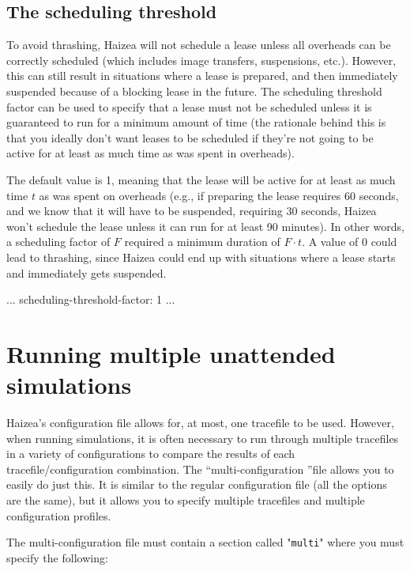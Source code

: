 \subsection{The scheduling threshold}

To avoid thrashing, Haizea will not schedule a lease unless all overheads
can be correctly scheduled (which includes image transfers, suspensions, etc.).
However, this can still result in situations where a lease is prepared,
and then immediately suspended because of a blocking lease in the future.
The scheduling threshold factor can be used to specify that a lease must
not be scheduled unless it is guaranteed to run for a minimum amount of
time (the rationale behind this is that you ideally don't want leases
to be scheduled if they're not going to be active for at least as much time
as was spent in overheads).
            
The default value is 1, meaning that the lease will be active for at least
as much time $t$ as was spent on overheads (e.g., if preparing the lease requires
60 seconds, and we know that it will have to be suspended, requiring 30 seconds,
Haizea won't schedule the lease unless it can run for at least 90 minutes).
In other words, a scheduling factor of $F$ required a minimum duration of 
$F\cdot t$. A value of 0 could lead to thrashing, since Haizea could end up with
situations where a lease starts and immediately gets suspended.   

\begin{wideshellverbatim}
[scheduling]
...
scheduling-threshold-factor: 1
...
\end{wideshellverbatim}

\section{Running multiple unattended simulations}
\label{sec:multiplesim}
Haizea's configuration file allows for, at most, one tracefile to be used. However, when running simulations, it is often necessary to run through multiple tracefiles in a variety of configurations to compare the results of each tracefile/configuration combination. The ``multi-configuration ''file allows you to easily do just this. It is similar to the regular configuration file (all the options are the same), but it allows you to specify multiple tracefiles and multiple configuration profiles.

The multi-configuration file must contain a section called "\texttt{multi}" where you must specify the following:

